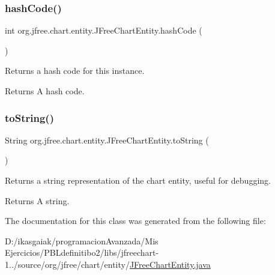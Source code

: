 \subsubsection{\texorpdfstring{hash\+Code()}{hashCode()}}
{\footnotesize\ttfamily int org.\+jfree.\+chart.\+entity.\+J\+Free\+Chart\+Entity.\+hash\+Code (\begin{DoxyParamCaption}{ }\end{DoxyParamCaption})}

Returns a hash code for this instance.

\begin{DoxyReturn}{Returns}
A hash code. 
\end{DoxyReturn}
\mbox{\label{classorg_1_1jfree_1_1chart_1_1entity_1_1_j_free_chart_entity_af0ee09cf39aa4f4ced8e7b1aa61b79d9}} 
\subsubsection{\texorpdfstring{to\+String()}{toString()}}
{\footnotesize\ttfamily String org.\+jfree.\+chart.\+entity.\+J\+Free\+Chart\+Entity.\+to\+String (\begin{DoxyParamCaption}{ }\end{DoxyParamCaption})}

Returns a string representation of the chart entity, useful for debugging.

\begin{DoxyReturn}{Returns}
A string. 
\end{DoxyReturn}


The documentation for this class was generated from the following file\+:\begin{DoxyCompactItemize}
\item 
D\+:/ikasgaiak/programacion\+Avanzada/\+Mis Ejercicios/\+P\+B\+Ldefinitibo2/libs/jfreechart-\/1../source/org/jfree/chart/entity/\mbox{\hyperlink{_j_free_chart_entity_8java}{J\+Free\+Chart\+Entity.\+java}}\end{DoxyCompactItemize}
